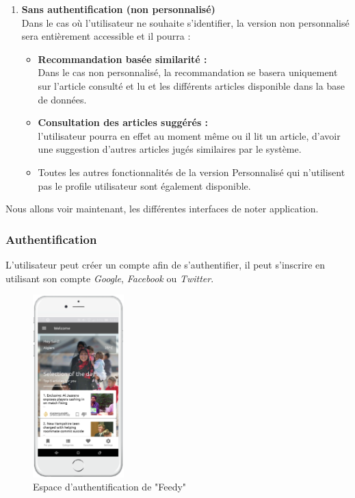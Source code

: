 \begin{enumerate}[leftmargin=*]
        \item\textbf{Sans authentification (non personnalisé)}\\
        Dans le cas où l'utilisateur ne souhaite s'identifier, la version non personnalisé sera entièrement accessible et il pourra :
        \begin{itemize}
            \item \textbf{Recommandation basée similarité :}\\
            Dans le cas non personnalisé, la recommandation se basera uniquement sur l'article consulté et lu et les différents articles disponible dans la base de données.    
            \item \textbf{Consultation des articles suggérés :}\\
            l'utilisateur pourra en effet au moment même ou il lit un article, d'avoir une suggestion d'autres articles jugés similaires par le système.
            \item Toutes les autres fonctionnalités de la version Personnalisé qui n'utilisent pas le profile utilisateur sont également disponible.
        \end{itemize}
    \end{enumerate}
    \vspace*{0.7cm}
    Nous allons voir maintenant, les différentes interfaces de noter application.
    \subsubsection{Authentification}
    L'utilisateur peut créer un compte afin de s'authentifier, il peut s'inscrire en utilisant son compte \emph{Google}, \emph{Facebook} ou \emph{Twitter}. 
        \begin{figure}[H]
            \centering
            \includegraphics[height=200pt,width=100pt]{img/chapter4/feedny/feedny.png}
            \caption{Espace d'authentification de "Feedy"}
            \label{}
        \end{figure}

